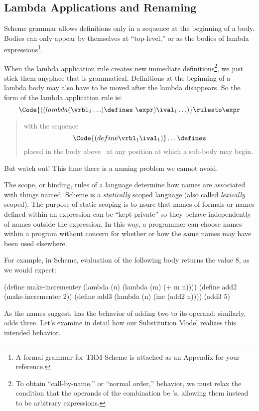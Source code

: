 \documentclass[11pt]{article}
\begin{document}
\subsection{Lambda Applications and Renaming}

Scheme grammar allows definitions only in a sequence at the beginning of a
body.  Bodies can only appear by themselves at ``top-level,'' or as the
bodies of lambda expressions\footnote{A formal grammar for TRM Scheme is
attached as an Appendix for your reference.}.

When the lambda application rule creates new immediate
definitions\footnote{To obtain ``call-by-name,'' or ``normal order,''
behavior, we must relax the condition that the operands of the combination
be \ival's, allowing them instead to be arbitrary expressions.}, we just
stick them anyplace that is grammatical.  Definitions at the beginning of
a lambda body may also have to be moved after the lambda disappears.
So the form of the lambda application rule is:
\[\Code{((lambda (\vrbl_{1}\ldots) \defines\ \expr) \ival_{1}\ldots)} \rulesto
\expr\]
\begin{quote}
with the sequence
\[\Code{(define \vrbl_1 \ival_{1})}\ldots\defines\]
placed in the body above \expr\ at any position at which a sub-body may
begin.
\end{quote}
But watch out!  This time there is a naming problem we cannot avoid.

The scope, or binding, rules of a language determine how names are
associated with things named.  Scheme is a {\em statically} scoped
language (also called {\em lexically} scoped).  The purpose of static
scoping is to nsure that names of formals or names defined within an
expression can be ``kept private'' so they behave independently of names
outside the expression.  In this way, a programmer can choose names within
a program without concern for whether or how the same names may have been
used elsewhere.

For example, in Scheme, evaluation of the following body returns
the value 8, as we would expect:
\begin{lisp}
(define make-incrementer (lambda (n) (lambda (m) (+ m n))))
(define add2 (make-incrementer 2))
(define add3 (lambda (n) (inc (add2 n))))
(add3 5)
\end{lisp}

As the names suggest,  has the behavior of adding two to its
operand; similarly,  adds three.  Let's examine in detail how
our Substitution Model realizes this intended behavior.
\end{document}
